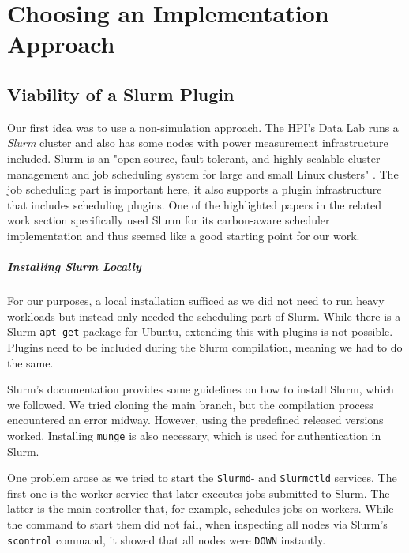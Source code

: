 \chapter{Choosing an Implementation Approach}

\section{Viability of a Slurm Plugin}
\label{subsec:slurm_plugin}

Our first idea was to use a non-simulation approach. 
The HPI's Data Lab  runs a \emph{Slurm} cluster and also has some nodes with power measurement infrastructure included. 
Slurm is an "open-source, fault-tolerant, and highly scalable cluster management and job scheduling system for large and small Linux clusters" .
The job scheduling part is important here, it also supports a plugin infrastructure that includes scheduling plugins. 
One of the highlighted papers \cite{inigo_goiri_greenslot_2011} in the related work section specifically used Slurm for its carbon-aware scheduler implementation and thus seemed like a good starting point for our work.

\paragraph{Installing Slurm Locally}

For our purposes, a local installation sufficed as we did not need to run heavy workloads but instead only needed the scheduling part of Slurm. 
While there is a Slurm \verb|apt get| package for Ubuntu, extending this with plugins is not possible. 
Plugins need to be included during the Slurm compilation, meaning we had to do the same.

Slurm's documentation provides some guidelines on how to install Slurm, which we followed. 
We tried cloning the main branch, but the compilation process encountered an error midway. However, using the predefined released versions worked.
Installing \verb|munge|  is also necessary, which is used for authentication in Slurm.

One problem arose as we tried to start the \verb|Slurmd|- and \verb|Slurmctld| services. The first one is the worker service that later executes jobs submitted to Slurm. The latter is the main controller that, for example, schedules jobs on workers. While the command to start them did not fail, when inspecting all nodes via Slurm's \verb|scontrol| command, it showed that all nodes were \verb|DOWN| instantly.

